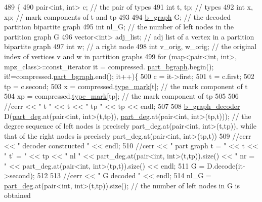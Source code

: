 \begin{DoxyCode}
489 \{
490   pair<int, int> c; \textcolor{comment}{// the pair of types}
491   \textcolor{keywordtype}{int} t, tp; \textcolor{comment}{// types}
492   \textcolor{keywordtype}{int} x, xp; \textcolor{comment}{// mark components of t and tp}
493 
494   \hyperlink{classb__graph}{b\_graph} G; \textcolor{comment}{// the decoded partition bipartite graph}
495   \textcolor{keywordtype}{int} nl\_G; \textcolor{comment}{// the number of left nodes in the partition graph G }
496   vector<int> adj\_list; \textcolor{comment}{// adj list of a vertex in a partition bipartite graph}
497   \textcolor{keywordtype}{int} w; \textcolor{comment}{// a right node}
498   \textcolor{keywordtype}{int} v\_orig, w\_orig; \textcolor{comment}{// the original index of vertices v and w in partition graphs }
499   \textcolor{keywordflow}{for} (map<pair<int, int>, mpz\_class>::const\_iterator it = compressed.
      \hyperlink{classmarked__graph__compressed_a7b3267063fba30b45eb21b3ba4e07536}{part\_bgraph}.begin(); it!=compressed.\hyperlink{classmarked__graph__compressed_a7b3267063fba30b45eb21b3ba4e07536}{part\_bgraph}.end(); it++)\{
500     c = it->first;
501     t = c.first;
502     tp = c.second;
503     x = compressed.\hyperlink{classmarked__graph__compressed_a86b00223525703e973415cbc9c94da68}{type\_mark}[t]; \textcolor{comment}{// the mark component of t}
504     xp = compressed.\hyperlink{classmarked__graph__compressed_a86b00223525703e973415cbc9c94da68}{type\_mark}[tp]; \textcolor{comment}{// the mark component of tp }
505 
506     \textcolor{comment}{//cerr << " t " << t << " tp " << tp << endl;}
507 
508     \hyperlink{classb__graph__decoder}{b\_graph\_decoder} D(\hyperlink{classmarked__graph__decoder_a6882e96fcad9abb10e72f1398814824a}{part\_deg}.at(pair<int, int>(t,tp)), 
      \hyperlink{classmarked__graph__decoder_a6882e96fcad9abb10e72f1398814824a}{part\_deg}.at(pair<int, int>(tp,t))); \textcolor{comment}{// the degree sequence of left nodes is precisely
       part\_deg.at(pair<int, int>(t,tp)), while that of the right nodes is precisely part\_deg.at(pair<int, int>(tp,t))}
509     \textcolor{comment}{//cerr << " decoder constructed " << endl;}
510     \textcolor{comment}{//cerr << " part graph t = "  << t << " t' = " << tp << " nl " << part\_deg.at(pair<int,
       int>(t,tp)).size() << " nr = " << part\_deg.at(pair<int, int>(tp,t)).size() << endl;}
511     G = D.decode(it->second);
512 
513     \textcolor{comment}{//cerr << " G decoded " << endl;}
514     nl\_G = \hyperlink{classmarked__graph__decoder_a6882e96fcad9abb10e72f1398814824a}{part\_deg}.at(pair<int, int>(t,tp)).size(); \textcolor{comment}{// the number of left nodes in G is obtained
}
\end{DoxyCode}
